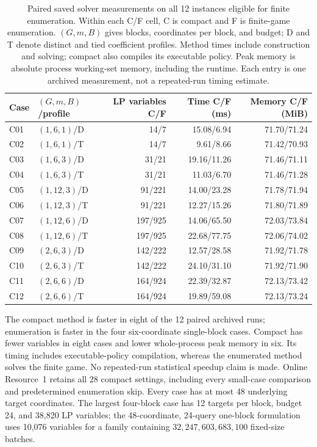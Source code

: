 \begin{table}[htbp]
\centering\small
\caption{Paired saved solver measurements on all 12 instances eligible for finite enumeration. Within each C/F cell, C is compact and F is finite-game enumeration. $(G,m,B)$ gives blocks, coordinates per block, and budget; D and T denote distinct and tied coefficient profiles. Method times include construction and solving; compact also compiles its executable policy. Peak memory is absolute process working-set memory, including the runtime. Each entry is one archived measurement, not a repeated-run timing estimate.}
\label{tab:risk_paired_solvers}
\begin{tabular}{llrrr}
\toprule
Case & $(G,m,B)$/profile & LP variables C/F & Time C/F (ms) & Memory C/F (MiB)\\
\midrule
C01 & $(1,6,1)$/D & 14/7 & 15.08/6.94 & 71.70/71.24 \\
C02 & $(1,6,1)$/T & 14/7 & 9.61/8.66 & 71.42/70.93 \\
C03 & $(1,6,3)$/D & 31/21 & 19.16/11.26 & 71.46/71.11 \\
C04 & $(1,6,3)$/T & 31/21 & 11.03/6.70 & 71.46/71.28 \\
C05 & $(1,12,3)$/D & 91/221 & 14.00/23.28 & 71.78/71.94 \\
C06 & $(1,12,3)$/T & 91/221 & 12.27/15.26 & 71.80/71.89 \\
C07 & $(1,12,6)$/D & 197/925 & 14.06/65.50 & 72.03/73.84 \\
C08 & $(1,12,6)$/T & 197/925 & 22.68/77.75 & 72.06/74.02 \\
C09 & $(2,6,3)$/D & 142/222 & 12.57/28.58 & 71.92/71.78 \\
C10 & $(2,6,3)$/T & 142/222 & 24.10/31.10 & 71.92/71.90 \\
C11 & $(2,6,6)$/D & 164/924 & 22.39/32.87 & 72.13/73.42 \\
C12 & $(2,6,6)$/T & 164/924 & 19.89/59.08 & 72.13/73.24 \\
\bottomrule
\end{tabular}
\end{table}

\FloatBarrier

The compact method is faster in eight of the 12 paired archived runs;
enumeration is faster in the four six-coordinate single-block cases.
Compact has fewer variables in eight cases and lower whole-process peak
memory in six. Its timing includes executable-policy compilation, whereas
the enumerated method solves the finite game. No repeated-run statistical
speedup claim is made. Online Resource~1 retains all 28 compact settings, including every
small-case comparison and predetermined enumeration skip. Every case has at most 48 underlying target coordinates. The largest
four-block case has 12 targets per block, budget 24, and 38,820 LP variables;
the 48-coordinate, 24-query one-block formulation uses 10,076 variables
for a family containing $32{,}247{,}603{,}683{,}100$ fixed-size batches.

